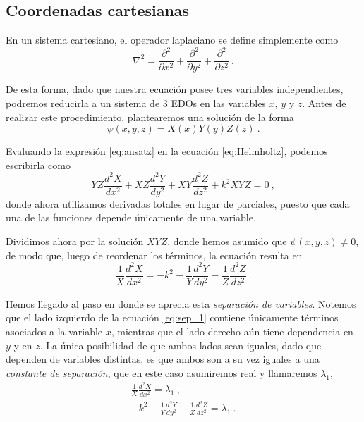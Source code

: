 \subsection{Coordenadas cartesianas}

En un sistema cartesiano, el operador laplaciano se define simplemente como
\begin{equation}
    \nabla^2 = \frac{\partial^2}{\partial x^2} + \frac{\partial^2}{\partial y^2} + \frac{\partial^2}{\partial z^2} \ .
\end{equation}

De esta forma, dado que nuestra ecuación posee tres variables independientes, podremos reducirla a un sistema de 3 EDOs en las variables $x$, $y$ y $z$. Antes de realizar este procedimiento, plantearemos una solución de la forma
\begin{equation}\label{eq:ansatz}
    \psi(x,y,z) = X(x)Y(y)Z(z) \ .
\end{equation}


Evaluando la expresión \eqref{eq:ansatz} en la ecuación \eqref{eq:Helmholtz}, podemos escribirla como
\begin{equation}
    YZ \frac{d^2X}{dx^2} + XZ \frac{d^2 Y}{dy^2} + XY \frac{d^2Z}{dz^2} + k^2 XYZ = 0 \ ,
\end{equation}
donde ahora utilizamos derivadas totales en lugar de parciales, puesto que cada una de las funciones depende únicamente de una variable.

Dividimos ahora por la solución $XYZ$, donde hemos asumido que $\psi(x,y,z) \neq 0$, de modo que, luego de reordenar los términos, la ecuación resulta en
\begin{equation} \label{eq:sep_1}
    \frac{1}{X} \frac{d^2 X}{dx^2} = -k^2 - \frac{1}{Y} \frac{d^2 Y}{dy^2} - \frac{1}{Z} \frac{d^2 Z}{dz^2} \ .
\end{equation}

Hemos llegado al paso en donde se aprecia esta \emph{separación de variables}. Notemos que el lado izquierdo de la ecuación \eqref{eq:sep_1} contiene únicamente términos asociados a la variable $x$, mientras que el lado derecho aún tiene dependencia en $y$ y en $z$. La única posibilidad de que ambos lados sean iguales, dado que dependen de variables distintas, es que ambos son a su vez iguales a una \emph{constante de separación}, que en este caso asumiremos real y llamaremos $\lambda_1$,
\begin{align}
    \frac{1}{X} \frac{d^2 X}{dx^2} = \lambda_1 \ , \\
    -k^2 - \frac{1}{Y} \frac{d^2Y}{dy^2} - \frac{1}{Z} \frac{d^2Z}{dz^2} = \lambda_1 \ . \label{eq:EDO_de_y_z}
\end{align}

